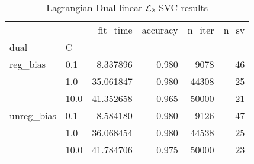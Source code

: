 \begin{table}[H]
\centering
\caption{Lagrangian Dual linear $\protect \mathcal{L}_2$-SVC results}
\label{linear_lagrangian_dual_l2_svc_cv_results}
\begin{tabular}{llrrrr}
\toprule
           &      &   fit\_time &  accuracy &  n\_iter &  n\_sv \\
dual & C &            &           &         &       \\
\midrule
reg\_bias & 0.1  &   8.337896 &     0.980 &    9078 &    46 \\
           & 1.0  &  35.061847 &     0.980 &   44308 &    25 \\
           & 10.0 &  41.352658 &     0.965 &   50000 &    21 \\
unreg\_bias & 0.1  &   8.584180 &     0.980 &    9126 &    47 \\
           & 1.0  &  36.068454 &     0.980 &   44538 &    25 \\
           & 10.0 &  41.784706 &     0.975 &   50000 &    23 \\
\bottomrule
\end{tabular}
\end{table}
